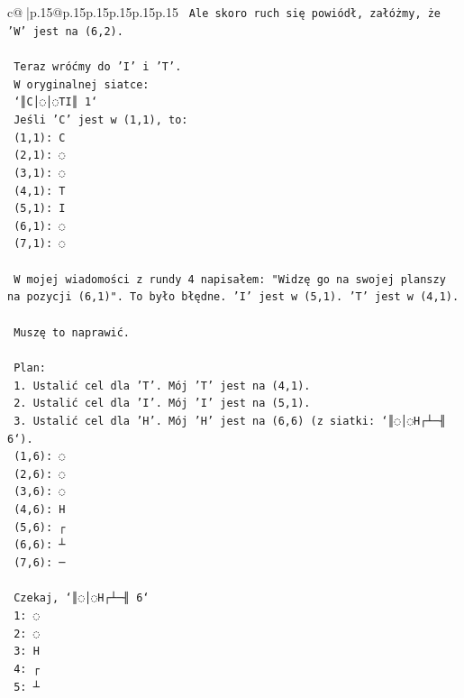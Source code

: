 \documentclass{article}
\begin{document}
{\begin{supertabular}{c@{$\;$}|p{.15\linewidth}@{}p{.15\linewidth}p{.15\linewidth}p{.15\linewidth}p{.15\linewidth}p{.15\linewidth}}
{{{\texttt{   Ale skoro ruch się powiódł, załóżmy, że 'W' jest na (6,2).} \\
\\ 
\texttt{   Teraz wróćmy do 'I' i 'T'.} \\
\texttt{   W oryginalnej siatce:} \\
\texttt{   `║C│◌│◌TI║ 1`} \\
\texttt{   Jeśli 'C' jest w (1,1), to:} \\
\texttt{   (1,1): C} \\
\texttt{   (2,1): ◌} \\
\texttt{   (3,1): ◌} \\
\texttt{   (4,1): T} \\
\texttt{   (5,1): I} \\
\texttt{   (6,1): ◌} \\
\texttt{   (7,1): ◌} \\
\\ 
\texttt{   W mojej wiadomości z rundy 4 napisałem: "Widzę go na swojej planszy na pozycji (6,1)". To było błędne. 'I' jest w (5,1). 'T' jest w (4,1).} \\
\\ 
\texttt{   Muszę to naprawić.} \\
\\ 
\texttt{   Plan:} \\
\texttt{   1. Ustalić cel dla 'T'. Mój 'T' jest na (4,1).} \\
\texttt{   2. Ustalić cel dla 'I'. Mój 'I' jest na (5,1).} \\
\texttt{   3. Ustalić cel dla 'H'. Mój 'H' jest na (6,6) (z siatki: `║◌│◌H┌┴─╢ 6`).} \\
\texttt{      (1,6): ◌} \\
\texttt{      (2,6): ◌} \\
\texttt{      (3,6): ◌} \\
\texttt{      (4,6): H} \\
\texttt{      (5,6): ┌} \\
\texttt{      (6,6): ┴} \\
\texttt{      (7,6): ─} \\
\\ 
\texttt{      Czekaj, `║◌│◌H┌┴─╢ 6`} \\
\texttt{      1: ◌} \\
\texttt{      2: ◌} \\
\texttt{      3: H} \\
\texttt{      4: ┌} \\
\texttt{      5: ┴} \\
}}}
\end{supertabular}}
\end{document}
